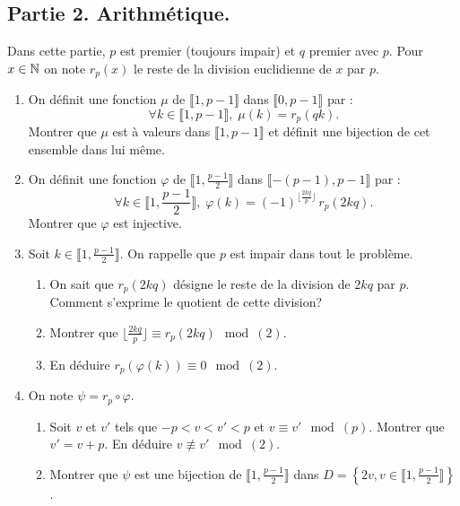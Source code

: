 \subsection*{Partie 2. Arithmétique.}\noindent
Dans cette partie, $p$ est premier (toujours impair) et $q$ premier avec $p$.\newline 
Pour $x \in \mathbb{N}$ on note $r_p(x)$ le reste de la division euclidienne de $x$ par $p$.
\begin{enumerate}
  \item On définit une fonction $\mu$ de $\llbracket 1, p-1 \rrbracket$ dans $\llbracket 0, p-1 \rrbracket$ par :
\[
  \forall k \in \llbracket 1, p-1 \rrbracket, \; \mu(k) = r_p(qk).
\]
Montrer que $\mu$ est à  valeurs dans $\llbracket 1, p-1 \rrbracket$ et définit une bijection de cet ensemble dans lui même.

  \item On définit une fonction $\varphi$ de $\llbracket 1, \frac{p-1}{2}\rrbracket$ dans $\llbracket -(p-1), p-1 \rrbracket$ par :
\[
  \forall k \in \llbracket 1, \frac{p-1}{2}\rrbracket, \; \varphi(k) = (-1)^{\lfloor \frac{2kq}{p}\rfloor}\, r_p(2kq).
\]
Montrer que $\varphi$ est injective.

  \item Soit $k \in \llbracket 1, \frac{p-1}{2}\rrbracket$. On rappelle que $p$ est impair dans tout le problème.
  \begin{enumerate}
    \item On sait que $r_p(2kq)$ désigne le reste de la division de $2kq$ par $p$. Comment s'exprime le quotient de cette division?
    \item   Montrer que $\lfloor \frac{2kq}{p} \rfloor  \equiv r_p(2kq) \mod(2)$.
     \item En déduire $r_p(\varphi(k)) \equiv 0 \mod(2)$.
  \end{enumerate}
  
  \item On note $\psi = r_p \circ \varphi$.
  \begin{enumerate}
    \item Soit $v$ et $v'$ tels que $-p < v < v'< p$ et $v \equiv v' \mod(p)$.\newline
    Montrer que $v' = v + p$. En déduire $v \not\equiv v' \mod(2)$.
    \item Montrer que $\psi$ est une bijection de $\llbracket 1, \frac{p-1}{2}\rrbracket$ dans $D = \left\lbrace 2v, v \in \llbracket 1, \frac{p-1}{2}\rrbracket \right\rbrace$.
  \end{enumerate}
\end{enumerate}

